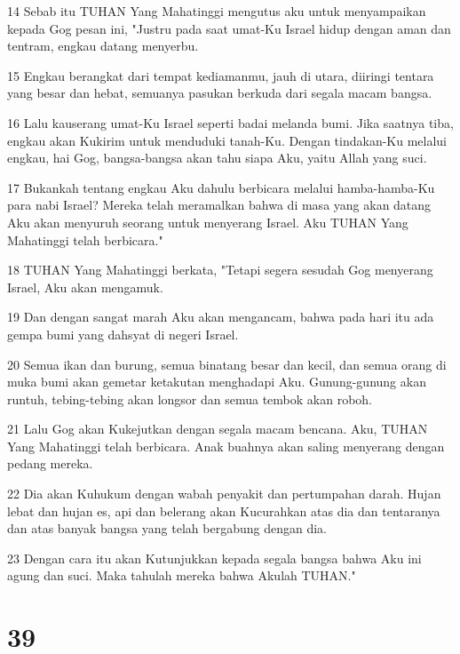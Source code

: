 \par 14 Sebab itu TUHAN Yang Mahatinggi mengutus aku untuk menyampaikan kepada Gog pesan ini, "Justru pada saat umat-Ku Israel hidup dengan aman dan tentram, engkau datang menyerbu.
\par 15 Engkau berangkat dari tempat kediamanmu, jauh di utara, diiringi tentara yang besar dan hebat, semuanya pasukan berkuda dari segala macam bangsa.
\par 16 Lalu kauserang umat-Ku Israel seperti badai melanda bumi. Jika saatnya tiba, engkau akan Kukirim untuk menduduki tanah-Ku. Dengan tindakan-Ku melalui engkau, hai Gog, bangsa-bangsa akan tahu siapa Aku, yaitu Allah yang suci.
\par 17 Bukankah tentang engkau Aku dahulu berbicara melalui hamba-hamba-Ku para nabi Israel? Mereka telah meramalkan bahwa di masa yang akan datang Aku akan menyuruh seorang untuk menyerang Israel. Aku TUHAN Yang Mahatinggi telah berbicara."
\par 18 TUHAN Yang Mahatinggi berkata, "Tetapi segera sesudah Gog menyerang Israel, Aku akan mengamuk.
\par 19 Dan dengan sangat marah Aku akan mengancam, bahwa pada hari itu ada gempa bumi yang dahsyat di negeri Israel.
\par 20 Semua ikan dan burung, semua binatang besar dan kecil, dan semua orang di muka bumi akan gemetar ketakutan menghadapi Aku. Gunung-gunung akan runtuh, tebing-tebing akan longsor dan semua tembok akan roboh.
\par 21 Lalu Gog akan Kukejutkan dengan segala macam bencana. Aku, TUHAN Yang Mahatinggi telah berbicara. Anak buahnya akan saling menyerang dengan pedang mereka.
\par 22 Dia akan Kuhukum dengan wabah penyakit dan pertumpahan darah. Hujan lebat dan hujan es, api dan belerang akan Kucurahkan atas dia dan tentaranya dan atas banyak bangsa yang telah bergabung dengan dia.
\par 23 Dengan cara itu akan Kutunjukkan kepada segala bangsa bahwa Aku ini agung dan suci. Maka tahulah mereka bahwa Akulah TUHAN."

\chapter{39}

